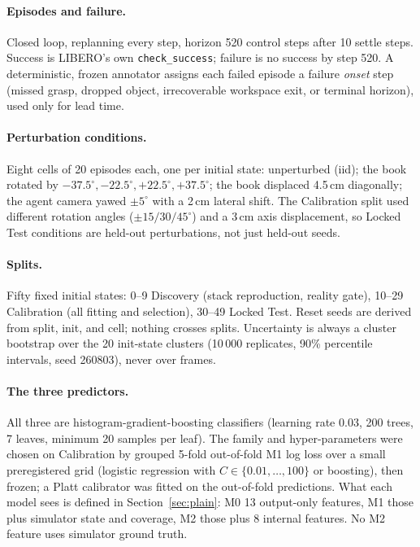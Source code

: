 \documentclass[11pt,a4paper]{article}
\newcommand{\Mz}{M0}\newcommand{\Mo}{M1}\newcommand{\Mt}{M2}
\begin{document}
\paragraph{Episodes and failure.} Closed loop, replanning every step, horizon 520 control steps after 10 settle steps. Success is LIBERO's own \texttt{check\_success}; failure is no success by step 520. A deterministic, frozen annotator assigns each failed episode a failure \emph{onset} step (missed grasp, dropped object, irrecoverable workspace exit, or terminal horizon), used only for lead time.

\paragraph{Perturbation conditions.} Eight cells of 20 episodes each, one per initial state: unperturbed (iid); the book rotated by $-37.5^\circ, -22.5^\circ, +22.5^\circ, +37.5^\circ$; the book displaced 4.5\,cm diagonally; the agent camera yawed $\pm 5^\circ$ with a 2\,cm lateral shift. The Calibration split used different rotation angles ($\pm 15/30/45^\circ$) and a 3\,cm axis displacement, so Locked Test conditions are held-out perturbations, not just held-out seeds.

\paragraph{Splits.} Fifty fixed initial states: 0--9 Discovery (stack reproduction, reality gate), 10--29 Calibration (all fitting and selection), 30--49 Locked Test. Reset seeds are derived from split, init, and cell; nothing crosses splits. Uncertainty is always a cluster bootstrap over the 20 init-state clusters (10\,000 replicates, 90\% percentile intervals, seed 260803), never over frames.

\paragraph{The three predictors.} All three are histogram-gradient-boosting classifiers (learning rate 0.03, 200 trees, 7 leaves, minimum 20 samples per leaf). The family and hyper-parameters were chosen on Calibration by grouped 5-fold out-of-fold \Mo{} log loss over a small preregistered grid (logistic regression with $C \in \{0.01,\dots,100\}$ or boosting), then frozen; a Platt calibrator was fitted on the out-of-fold predictions. What each model sees is defined in Section~\ref{sec:plain}: \Mz{} 13 output-only features, \Mo{} those plus simulator state and coverage, \Mt{} those plus 8 internal features. No \Mt{} feature uses simulator ground truth.
\end{document}
